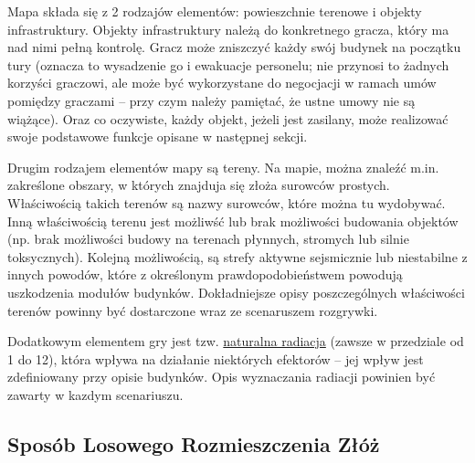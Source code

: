 \documentclass[11pt,a4paper]{article}
\begin{document}
Mapa składa się z 2 rodzajów elementów: powieszchnie terenowe i objekty infrastruktury. Objekty infrastruktury należą do konkretnego gracza, który ma nad nimi pełną kontrolę. Gracz może zniszczyć każdy swój budynek na początku tury (oznacza to wysadzenie go i ewakuacje personelu; nie przynosi to żadnych korzyści graczowi, ale może być wykorzystane do negocjacji w ramach umów pomiędzy graczami -- przy czym należy pamiętać, że ustne umowy nie są wiążące). Oraz co oczywiste, każdy objekt, jeżeli jest zasilany, może realizować swoje podstawowe funkcje opisane w następnej sekcji.

Drugim rodzajem elementów mapy są tereny. Na mapie, można znaleźć m.in. zakreślone obszary, w których znajduja się złoża surowców prostych. Właściwością takich terenów są nazwy surowców, które można tu wydobywać. Inną właściwością terenu jest możliwść lub brak możliwości budowania objektów (np. brak możliwości budowy na terenach płynnych, stromych lub silnie toksycznych). Kolejną możliwością, są strefy aktywne sejsmicznie lub niestabilne z innych powodów, które z określonym prawdopodobieństwem powodują uszkodzenia modułów budynków. Dokładniejsze opisy poszczególnych właściwości terenów powinny być dostarczone wraz ze scenaruszem rozgrywki.

Dodatkowym elementem gry jest tzw. \underline{naturalna radiacja} (zawsze w przedziale od 1 do 12), która wpływa na działanie niektórych efektorów -- jej wpływ jest zdefiniowany przy opisie budynków. Opis wyznaczania radiacji powinien być zawarty w kazdym scenariuszu.

\newpage

\subsection{Sposób Losowego Rozmieszczenia Złóż}
\end{document}
